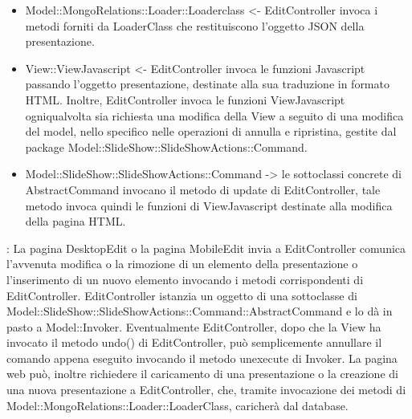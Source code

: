 {{\begin{itemize}
			\item Model::\-MongoRelations::\-Loader::\-Loaderclass <- EditController invoca i metodi forniti da LoaderClass che restituiscono l'oggetto JSON della presentazione. 
			\item View::\-ViewJavascript <- EditController invoca le funzioni Javascript passando l'oggetto presentazione, destinate alla sua traduzione in formato HTML. Inoltre, EditController invoca le funzioni ViewJavascript ogniqualvolta sia richiesta una modifica della View a seguito di una modifica del model, nello specifico nelle operazioni di annulla e ripristina, gestite dal package Model::\-SlideShow::\-SlideShowActions::\-Command.
			\item Model::\-SlideShow::\-SlideShowActions::\-Command -> le sottoclassi concrete di AbstractCommand invocano il metodo di update di EditController, tale metodo invoca quindi le funzioni di ViewJavascript destinate alla modifica della pagina HTML.
		\end{itemize} 
		\textbf{\interfacce}: La pagina DesktopEdit o la pagina MobileEdit invia a EditController comunica l’avvenuta modifica o la rimozione di un elemento della presentazione o l’inserimento di un nuovo elemento invocando i metodi corrispondenti di EditController. EditController istanzia un oggetto di una sottoclasse di Model::\-SlideShow::\-SlideShowActions::\-Command::\-AbstractCommand e lo dà in pasto a Model::\-Invoker. Eventualmente EditController, dopo che la View ha invocato il metodo undo() di EditController, può semplicemente annullare il comando appena eseguito invocando il metodo unexecute di Invoker.
		La pagina web può, inoltre richiedere il caricamento di una presentazione o la creazione di una nuova presentazione a EditController, che, tramite invocazione dei metodi di Model::\-MongoRelations::\-Loader::\-LoaderClass, caricherà dal database.
		\\
	}
}
